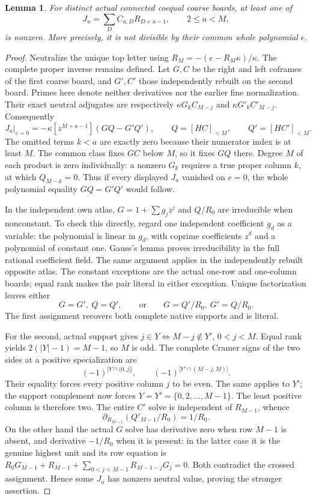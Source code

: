 \documentclass[11pt,a4paper]{amsart}
\numberwithin{equation}{section}
\theoremstyle{plain}
\newtheorem{lemma}[theorem]{Lemma}
\theoremstyle{definition}
\begin{document}
\begin{lemma}\label{ph:all-J}
For distinct actual connected coequal coarse boards, at least one of
\[
 J_a=\sum_D C_{a,D}R_{D+a-1},\qquad 2\le a<M,
\]
is nonzero.  More precisely, it is not divisible by their common whole
polynomial \(e\).
\end{lemma}
\begin{proof}
Neutralize the unique top letter using
\(R_M=-(e-R_M\kappa)/\kappa\).
The complete proper inverse remains defined.  Let \(G,C\) be the
right and left coframes of the first coarse board, and \(G',C'\)
those independently rebuilt on the second board.  Primes here
denote neither derivatives nor the earlier fine normalization.
Their exact neutral adjugates are respectively
\(\kappa G_kC_{M-j}\) and \(\kappa G'_kC'_{M-j}\).  Consequently
\[
 J_a\big|_{e=0}=-\kappa[z^{M+a-1}](GQ-G'Q'),
 \qquad Q=[HC]_{<M},\qquad Q'=[HC']_{<M}.
\]
The omitted terms \(k<a\) are exactly zero because their numerator index
is at least \(M\).  The common class fixes \(GC\) below \(M\), so it fixes
\(GQ\) there.  Degree \(M\) of each product is zero individually:
a nonzero \(G_k\) requires a true proper column \(k\), at which
\(Q_{M-k}=0\).  Thus if every displayed \(J_a\) vanished on \(e=0\),
the whole polynomial equality \(GQ=G'Q'\) would follow.

In the independent own atlas, \(G=1+\sum g_jz^j\) and \(Q/R_0\) are
irreducible when nonconstant.  To check this directly, regard one
independent coefficient \(g_d\) as a variable: the polynomial is linear
in \(g_d\), with coprime coefficients \(z^d\) and a polynomial of constant
one.  Gauss's lemma proves irreducibility in the full rational coefficient
field.  The same argument applies in the independently rebuilt opposite
atlas.  The constant exceptions are the actual one-row and one-column
boards; equal rank makes the pair literal in either exception.
Unique factorization leaves either
\[
 G=G',\ Q=Q',\qquad\text{or}\qquad
 G=Q'/R_0,\ G'=Q/R_0.
\]
The first assignment recovers both complete native supports and is literal.

For the second, actual support gives
\(j\in Y\Longleftrightarrow M-j\notin Y'\), \(0<j<M\).
Equal rank yields \(2(|Y|-1)=M-1\), so \(M\) is odd.
The complete Cramer signs of the two sides at a positive specialization
are
\[
 (-1)^{|Y\cap(0,j]|},
 \qquad (-1)^{|Y'\cap(M-j,M)|}.
\]
Their equality forces every positive column \(j\) to be even.
The same applies to \(Y'\); the support complement now forces
\(Y=Y'=\{0,2,\ldots,M-1\}\).
The least positive column is therefore two.
The entire \(C'\) solve is independent of \(R_{M-1}\), whence
\[
 \partial_{R_{M-1}}(Q'_{M-1}/R_0)=1/R_0.
\]
On the other hand the actual \(G\) solve has derivative zero when row
\(M-1\) is absent, and derivative \(-1/R_0\) when it is present: in the
latter case it is the genuine highest unit and its row equation is
\(R_0G_{M-1}+R_{M-1}+\sum_{0<j<M-1}R_{M-1-j}G_j=0\).
Both contradict the crossed assignment.  Hence some \(J_a\) has nonzero
neutral value, proving the stronger assertion.
\end{proof}
\end{document}
